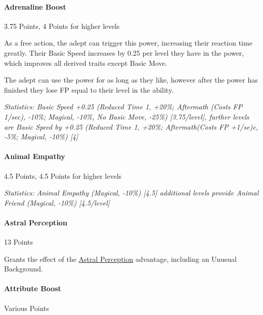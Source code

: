 \begin{multicols*}{3}
	\paragraph{Adrenaline Boost}
	\begin{flushright}
		3.75 Points, 4 Points for higher levels
	\end{flushright}
	
	As a free action, the adept can trigger this power, increasing their reaction time greatly. Their Basic Speed increases by 0.25 per level they have in the power, which improves all derived traits except Basic Move. 
	
	The adept can use the power for as long as they like, however after the power has finished they lose FP equal to their level in the ability.
	
	\textcolor{OliveGreen}{\textit{Statistics: Basic Speed +0.25 (Reduced Time 1, +20\%; Aftermath (Costs FP 1/sec), -10\%; Magical, -10\%, No Basic Move, -25\%) [3.75/level], further levels are Basic Speed by +0.25 (Reduced Time 1, +20\%; Aftermath(Costs FP +1/se)c, -5\%; Magical, -10\%) [4] }}
	
	\paragraph{Animal Empathy}
	\begin{flushright}
		4.5 Points, 4.5 Points for higher levels
	\end{flushright}
	
	\textcolor{OliveGreen}{\textit{Statistics: Animal Empathy (Magical, -10\%) [4.5] additional levels provide Animal Friend (Magical, -10\%) [4.5/level]}} 
	
	\paragraph{Astral Perception}
	\begin{flushright}
		13 Points
	\end{flushright}
	
	Grants the effect of the \hyperref[astral_perception]{Astral Perception} advantage, including an Unusual Background.
	
	\paragraph{Attribute Boost }
	\begin{flushright}
	Various Points
	\end{flushright}


\end{multicols*}
